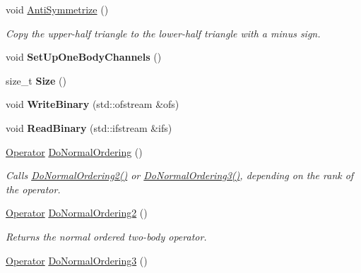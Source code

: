 \begin{DoxyCompactItemize}
\mbox{\label{classOperator_a21a37daa051c248109153e6502b8280f}} 
void \hyperlink{classOperator_a21a37daa051c248109153e6502b8280f}{Anti\+Symmetrize} ()
\begin{DoxyCompactList}\small\item\em Copy the upper-\/half triangle to the lower-\/half triangle with a minus sign. \end{DoxyCompactList}\item 
\mbox{\label{classOperator_ad6168f16f6c0b2cf70a1fc0676e70523}} 
void {\bfseries Set\+Up\+One\+Body\+Channels} ()
\item 
\mbox{\label{classOperator_a953ce26eec380dd538bd288009f4643e}} 
size\+\_\+t {\bfseries Size} ()
\item 
\mbox{\label{classOperator_aa3a24681b6b5b5a3e5ef259e418611d9}} 
void {\bfseries Write\+Binary} (std\+::ofstream \&ofs)
\item 
\mbox{\label{classOperator_ad914caae3f2e24606e429da96eb70300}} 
void {\bfseries Read\+Binary} (std\+::ifstream \&ifs)
\item 
\mbox{\label{classOperator_a622880b91a902c832b867c6447a262e7}} 
\hyperlink{classOperator}{Operator} \hyperlink{classOperator_a622880b91a902c832b867c6447a262e7}{Do\+Normal\+Ordering} ()
\begin{DoxyCompactList}\small\item\em Calls \hyperlink{classOperator_a652d989590422a2b26e662625b07254e}{Do\+Normal\+Ordering2()} or \hyperlink{classOperator_a7fd029569796107c87ff17c5a7912480}{Do\+Normal\+Ordering3()}, depending on the rank of the operator. \end{DoxyCompactList}\item 
\hyperlink{classOperator}{Operator} \hyperlink{classOperator_a652d989590422a2b26e662625b07254e}{Do\+Normal\+Ordering2} ()
\begin{DoxyCompactList}\small\item\em Returns the normal ordered two-\/body operator. \end{DoxyCompactList}\item 
\hyperlink{classOperator}{Operator} \hyperlink{classOperator_a7fd029569796107c87ff17c5a7912480}{Do\+Normal\+Ordering3} ()

\end{DoxyCompactItemize}
